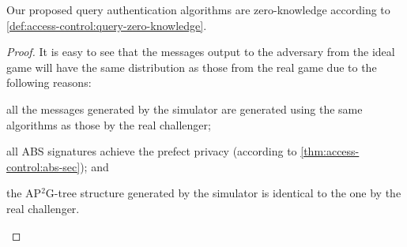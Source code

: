 \begin{lemma}\label{lemma:access-control:query-zero-knowledge}
  Our proposed query authentication algorithms are zero-knowledge according to \cref{def:access-control:query-zero-knowledge}.
\end{lemma}

\begin{proof}
  It is easy to see that the messages output to the adversary from the ideal game will have the same distribution as those from the real game due to the following reasons:
  \begin{inlineenum}
  \item all the messages generated by the simulator are generated using the same algorithms as those by the real challenger;
  \item all ABS signatures achieve the prefect privacy (according to \cref{thm:access-control:abs-sec}); and
  \item the AP$^2$G-tree structure generated by the simulator is identical to the one by the real challenger.
  \end{inlineenum}
\end{proof}

